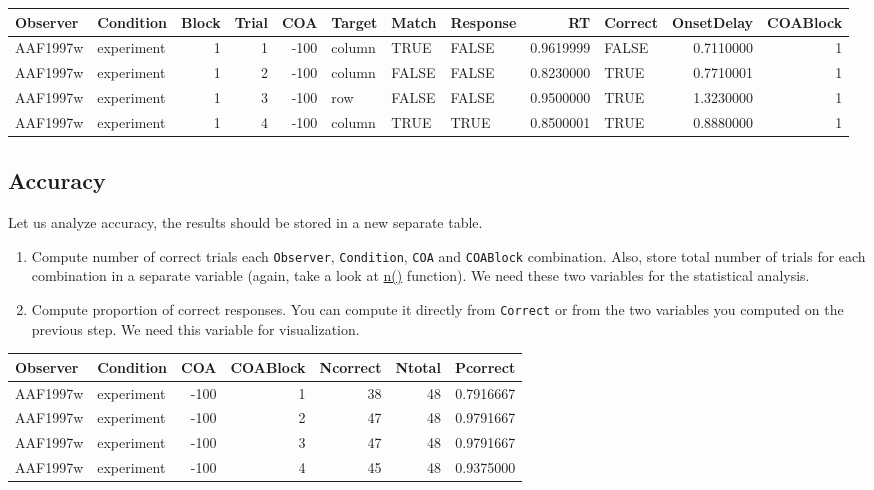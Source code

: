 \documentclass[
]{book}
\providecommand{\tightlist}{%
  \setlength{\itemsep}{0pt}\setlength{\parskip}{0pt}}
\begin{document}
\begin{tabular}{l|l|r|r|r|l|l|l|r|l|r|r}
\hline
Observer & Condition & Block & Trial & COA & Target & Match & Response & RT & Correct & OnsetDelay & COABlock\\
\hline
AAF1997w & experiment & 1 & 1 & -100 & column & TRUE & FALSE & 0.9619999 & FALSE & 0.7110000 & 1\\
\hline
AAF1997w & experiment & 1 & 2 & -100 & column & FALSE & FALSE & 0.8230000 & TRUE & 0.7710001 & 1\\
\hline
AAF1997w & experiment & 1 & 3 & -100 & row & FALSE & FALSE & 0.9500000 & TRUE & 1.3230000 & 1\\
\hline
AAF1997w & experiment & 1 & 4 & -100 & column & TRUE & TRUE & 0.8500001 & TRUE & 0.8880000 & 1\\
\hline
\end{tabular}

\hypertarget{accuracy}{%
\subsection*{Accuracy}\label{accuracy}}

Let us analyze accuracy, the results should be stored in a new separate table.

\begin{enumerate}
\def\labelenumi{\arabic{enumi}.}
\tightlist
\item
  Compute number of correct trials each \texttt{Observer}, \texttt{Condition}, \texttt{COA} and \texttt{COABlock} combination. Also, store total number of trials for each combination in a separate variable (again, take a look at \href{https://dplyr.tidyverse.org/reference/n.html}{n()} function). We need these two variables for the statistical analysis.
\item
  Compute proportion of correct responses. You can compute it directly from \texttt{Correct} or from the two variables you computed on the previous step. We need this variable for visualization.
\end{enumerate}

\begin{tabular}{l|l|r|r|r|r|r}
\hline
Observer & Condition & COA & COABlock & Ncorrect & Ntotal & Pcorrect\\
\hline
AAF1997w & experiment & -100 & 1 & 38 & 48 & 0.7916667\\
\hline
AAF1997w & experiment & -100 & 2 & 47 & 48 & 0.9791667\\
\hline
AAF1997w & experiment & -100 & 3 & 47 & 48 & 0.9791667\\
\hline
AAF1997w & experiment & -100 & 4 & 45 & 48 & 0.9375000\\
\hline
\end{tabular}
\end{document}
